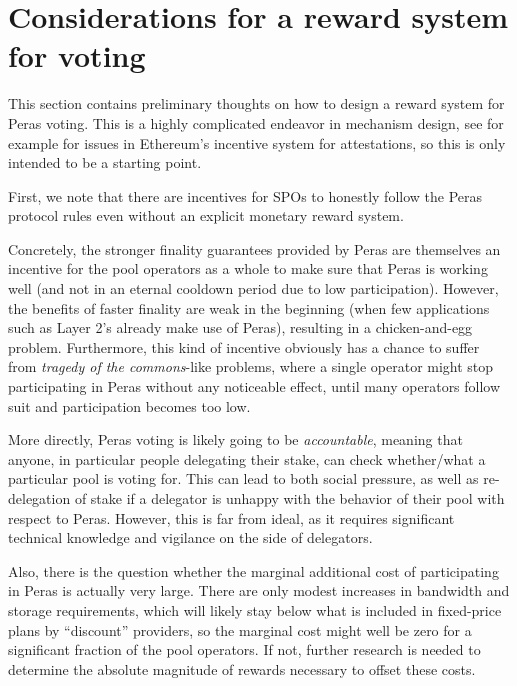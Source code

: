 \chapter{Considerations for a reward system for voting}\label{chap:rewards}

This section contains preliminary thoughts on how to design a reward system for Peras voting.
This is a highly complicated endeavor in mechanism design, see for example \cite{zhang2024max} for issues in Ethereum's incentive system for attestations, so this is only intended to be a starting point.

\medskip
First, we note that there are incentives for SPOs to honestly follow the Peras protocol rules even without an explicit monetary reward system.

Concretely, the stronger finality guarantees provided by Peras are themselves an incentive for the pool operators as a whole to make sure that Peras is working well (and not in an eternal cooldown period due to low participation).
However, the benefits of faster finality are weak in the beginning (when few applications such as Layer 2's already make use of Peras), resulting in a chicken-and-egg problem.
Furthermore, this kind of incentive obviously has a chance to suffer from \emph{tragedy of the commons}-like problems, where a single operator might stop participating in Peras without any noticeable effect, until many operators follow suit and participation becomes too low.

More directly, Peras voting is likely going to be \emph{accountable}, meaning that anyone, in particular people delegating their stake, can check whether/what a particular pool is voting for.
This can lead to both social pressure, as well as re-delegation of stake if a delegator is unhappy with the behavior of their pool with respect to Peras.
However, this is far from ideal, as it requires significant technical knowledge and vigilance on the side of delegators.

Also, there is the question whether the marginal additional cost of participating in Peras is actually very large.
There are only modest increases in bandwidth and storage requirements, which will likely stay below what is included in fixed-price plans by \enquote{discount} providers, so the marginal cost might well be zero for a significant fraction of the pool operators.
If not, further research is needed to determine the absolute magnitude of rewards necessary to offset these costs.


